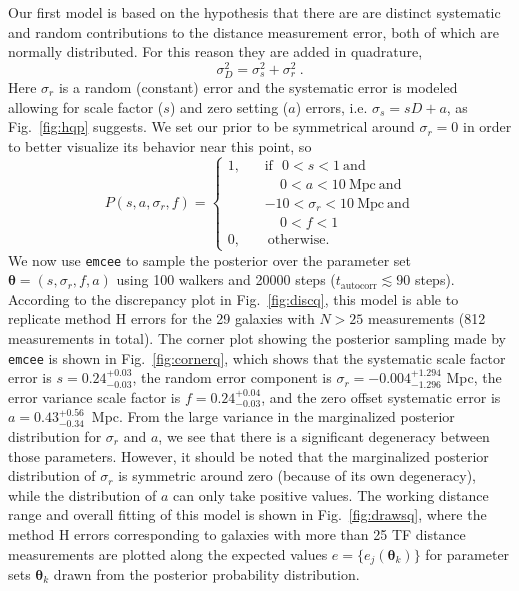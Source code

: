 \documentclass[a4paper,fleqn,usenatbib]{mnras}
\begin{document}
Our first model is based on the hypothesis that there are are distinct systematic and random contributions to the distance measurement error, both of which are normally distributed. For this reason they are added in quadrature, 
\begin{equation}
\sigma_D^2=\sigma_s^2+\sigma_r^2\ .
	\label{eq:bayq}
\end{equation}
Here $\sigma_r$ is a random (constant) error and the systematic error is modeled allowing for scale factor ($s$) and zero setting ($a$) errors, i.e.  $\sigma_s=sD+a$, as Fig.~\ref{fig:hqp} suggests.  We set our prior to be symmetrical around $\sigma_r=0$ in order to better visualize its behavior near this point, so
\begin{equation}
P(s,a,\sigma_r,f)=\left\{
\begin{aligned}
1,\ \ \ \ &\mathrm{if}\ \ \ 0<s<1\ \mathrm{and}\\
& \ \ \ \ \  0<a<10\ \mathrm{Mpc}\ \mathrm{and}\\
&-10<\sigma_r<10\ \mathrm{Mpc}\ \mathrm{and}\\
& \ \ \ \ \  0<f<1\\
0,\ \ \ \ &\ \mathrm{otherwise.}
\end{aligned}
\right.
	\label{eq:priorq}
\end{equation}
We now use \texttt{emcee} to sample the posterior over the parameter set $\pmb{\theta}=(s,\sigma_r,f,a)$ using 100 walkers and 20000 steps ($t_\mathrm{autocorr} \lesssim 90$ steps). According to the discrepancy plot in Fig.~\ref{fig:discq}, this model is able to replicate method H errors for the 29 galaxies with $N>25$ measurements (812 measurements in total). The corner plot showing the posterior sampling made by \texttt{emcee} is shown in Fig.~\ref{fig:cornerq}, which shows that the systematic scale factor error is $s=0.24_{-0.03}^{+0.03}$, the random error component is $\sigma_r=-0.004_{-1.296}^{+1.294}$ Mpc, the error variance scale factor is $f=0.24_{-0.03}^{+0.04}$, and the zero offset systematic error is $a=0.43_{-0.34}^{+0.56}$\ Mpc. From the large variance in the marginalized posterior distribution for $\sigma_r$ and $a$, we see that there is a significant degeneracy between those parameters. However, it should be noted that the marginalized posterior distribution of $\sigma_r$ is symmetric around zero (because of its own degeneracy), while the distribution of $a$ can only take positive values. The working distance range and overall fitting of this model is shown in Fig.~\ref{fig:drawsq}, where the method H errors corresponding to galaxies with more than 25 TF distance measurements are plotted along the expected values $e=\{e_j(\pmb{\theta}_k)\}$ for parameter sets $\pmb{\theta}_k$ drawn from the posterior probability distribution. 
\end{document}
